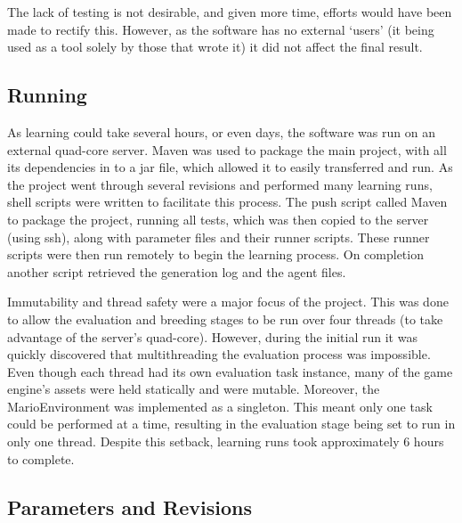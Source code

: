 The lack of testing is not desirable, and given more time, efforts would have been made to rectify this. However, as the software has no external `users' (it being used as a tool solely by those that wrote it) it did not affect the final result.



\subsection{Running}

As learning could take several hours, or even days, the software was run on an external quad-core server. Maven was used to package the main project, with all its dependencies in to a jar file, which allowed it to easily transferred and run. As the project went through several revisions and performed many learning runs, shell scripts were written to facilitate this process. The push script called Maven to package the project, running all tests, which was then copied to the server (using ssh), along with parameter files and their runner scripts. These runner scripts were then run remotely to begin the learning process. On completion another script retrieved the generation log and the agent files.

Immutability and thread safety were a major focus of the project. This was done to allow the evaluation and breeding stages to be run over four threads (to take advantage of the server's quad-core). However, during the initial run it was quickly discovered that multithreading the evaluation process was impossible. Even though each thread had its own evaluation task instance, many of the game engine's assets were held statically and were mutable. Moreover, the MarioEnvironment was implemented as a singleton. This meant only one task could be performed at a time, resulting in the evaluation stage being set to run in only one thread. Despite this setback, learning runs took approximately 6 hours to complete.


\subsection{Parameters and Revisions}
\label{subsec:learnparam}


